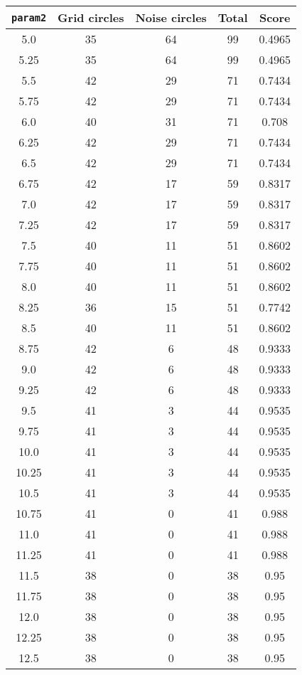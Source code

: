 \documentclass[letterpaper, 12pt]{article}
\begin{document}
\begin{longtable}{|c|c|c|c|c|}
\hline
\textbf{\texttt{param2}} & \textbf{Grid circles} & \textbf{Noise circles} & \textbf{Total} & \textbf{Score} \\
\hline
5.0 & 35 & 64 & 99 & 0.4965 \\
\hline
5.25 & 35 & 64 & 99 & 0.4965 \\
\hline
5.5 & 42 & 29 & 71 & 0.7434 \\
\hline
5.75 & 42 & 29 & 71 & 0.7434 \\
\hline
6.0 & 40 & 31 & 71 & 0.708 \\
\hline
6.25 & 42 & 29 & 71 & 0.7434 \\
\hline
6.5 & 42 & 29 & 71 & 0.7434 \\
\hline
6.75 & 42 & 17 & 59 & 0.8317 \\
\hline
7.0 & 42 & 17 & 59 & 0.8317 \\
\hline
7.25 & 42 & 17 & 59 & 0.8317 \\
\hline
7.5 & 40 & 11 & 51 & 0.8602 \\
\hline
7.75 & 40 & 11 & 51 & 0.8602 \\
\hline
8.0 & 40 & 11 & 51 & 0.8602 \\
\hline
8.25 & 36 & 15 & 51 & 0.7742 \\
\hline
8.5 & 40 & 11 & 51 & 0.8602 \\
\hline
8.75 & 42 & 6 & 48 & 0.9333 \\
\hline
9.0 & 42 & 6 & 48 & 0.9333 \\
\hline
9.25 & 42 & 6 & 48 & 0.9333 \\
\hline
9.5 & 41 & 3 & 44 & 0.9535 \\
\hline
9.75 & 41 & 3 & 44 & 0.9535 \\
\hline
10.0 & 41 & 3 & 44 & 0.9535 \\
\hline
10.25 & 41 & 3 & 44 & 0.9535 \\
\hline
10.5 & 41 & 3 & 44 & 0.9535 \\
\hline
10.75 & 41 & 0 & 41 & 0.988 \\
\hline
11.0 & 41 & 0 & 41 & 0.988 \\
\hline
11.25 & 41 & 0 & 41 & 0.988 \\
\hline
11.5 & 38 & 0 & 38 & 0.95 \\
\hline
11.75 & 38 & 0 & 38 & 0.95 \\
\hline
12.0 & 38 & 0 & 38 & 0.95 \\
\hline
12.25 & 38 & 0 & 38 & 0.95 \\
\hline
12.5 & 38 & 0 & 38 & 0.95 \\

\end{longtable}
\end{document}
